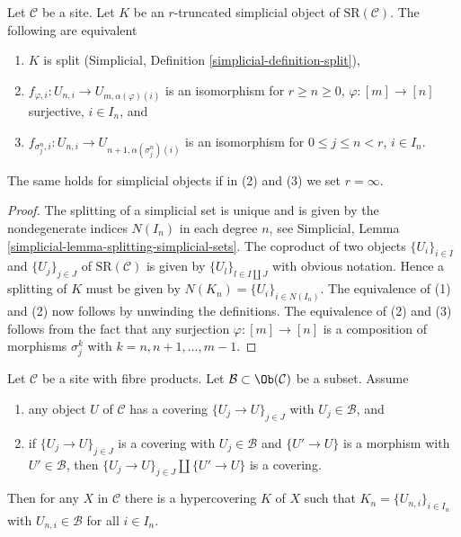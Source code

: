 \begin{lemma}
\label{lemma-split}
Let $\mathcal{C}$ be a site. Let $K$ be an $r$-truncated simplicial object
of $\text{SR}(\mathcal{C})$. The following are equivalent
\begin{enumerate}
\item $K$ is split (Simplicial, Definition \ref{simplicial-definition-split}),
\item $f_{\varphi, i} : U_{n, i} \to U_{m, \alpha(\varphi)(i)}$
is an isomorphism for $r \geq n \geq 0$,
$\varphi : [m] \to [n]$ surjective, $i \in I_n$, and
\item $f_{\sigma^n_j, i} : U_{n, i} \to U_{n + 1, \alpha(\sigma^n_j)(i)}$
is an isomorphism for $0 \leq j \leq n < r$, $i \in I_n$.
\end{enumerate}
The same holds for simplicial objects if in (2) and (3)
we set $r = \infty$.
\end{lemma}

\begin{proof}
The splitting of a simplicial set is unique and is given by
the nondegenerate indices $N(I_n)$ in each degree $n$, see
Simplicial, Lemma \ref{simplicial-lemma-splitting-simplicial-sets}.
The coproduct of two objects $\{U_i\}_{i \in I}$ and $\{U_j\}_{j \in J}$
of $\text{SR}(\mathcal{C})$ is given by $\{U_l\}_{l \in I \amalg J}$
with obvious notation. Hence a splitting of $K$ must be given by
$N(K_n) = \{U_i\}_{i \in N(I_n)}$. The equivalence of (1) and (2)
now follows by unwinding the definitions. The equivalence of (2)
and (3) follows from the fact that any surjection
$\varphi : [m] \to [n]$ is a composition of morphisms
$\sigma^k_j$ with $k = n, n + 1, \ldots, m - 1$.
\end{proof}

\begin{lemma}
\label{lemma-hypercovering-object}
Let $\mathcal{C}$ be a site with fibre products.
Let $\mathcal{B} \subset \Ob(\mathcal{C})$ be a subset.
Assume
\begin{enumerate}
\item any object $U$ of $\mathcal{C}$ has a covering
$\{U_j \to U\}_{j \in J}$ with $U_j \in \mathcal{B}$, and
\item if $\{U_j \to U\}_{j \in J}$ is a covering
with $U_j \in \mathcal{B}$ and $\{U' \to U\}$ is a morphism with
$U' \in \mathcal{B}$, then $\{U_j \to U\}_{j \in J} \amalg \{U' \to U\}$
is a covering.
\end{enumerate}
Then for any $X$ in $\mathcal{C}$ there is a hypercovering $K$
of $X$ such that $K_n = \{U_{n, i}\}_{i \in I_n}$
with $U_{n, i} \in \mathcal{B}$ for all $i \in I_n$.
\end{lemma}

